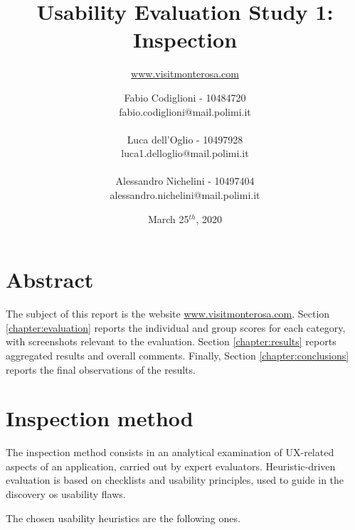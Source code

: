\documentclass[a4paper, 11pt, parskip=half, headsepline]{scrreprt}
\title{Usability Evaluation Study 1:\\ Inspection }
\subtitle{\href{https://www.visitmonterosa.com}{www.visitmonterosa.com}}
\author{Fabio Codiglioni - 10484720\\fabio.codiglioni@mail.polimi.it\\\\Luca dell'Oglio - 10497928\\luca1.delloglio@mail.polimi.it\\\\Alessandro Nichelini - 10497404\\alessandro.nichelini@mail.polimi.it}
\date{March 25$^{th}$, 2020}
\begin{document}
\maketitle
\tableofcontents
\newpage
{}


\chapter{Abstract}

The subject of this report is the website \href{www.visitmonterosa.com}{www.visitmonterosa.com}. Section \ref{chapter:evaluation} reports the individual and group scores for each category, with screenshots relevant to the evaluation. Section \ref{chapter:results} reports aggregated results and overall comments. Finally, Section \ref{chapter:conclusions} reports the final observations of the results.




\chapter{Inspection method}
\label{chapter:method}

The inspection method consists in an analytical examination of UX-related aspects of an application, carried out by expert evaluators. Heuristic-driven evaluation is based on checklists and usability principles, used to guide in the discovery os usability flaws.

The chosen usability heuristics are the following ones.
\end{document}
